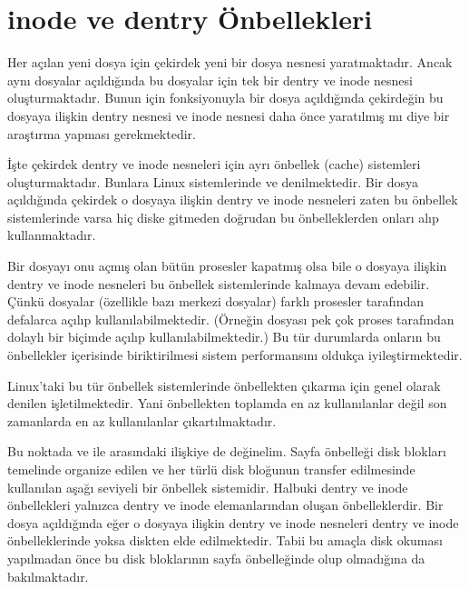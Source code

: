 \documentclass[a4paper,10pt,turkish]{sphinxmanual}
\begin{document}
\section{inode ve dentry Önbellekleri}
\label{\detokenize{filesystem1:inode-ve-dentry-onbellekleri}}
\sphinxAtStartPar
Her açılan yeni dosya için çekirdek yeni bir dosya nesnesi yaratmaktadır. Ancak aynı dosyalar
açıldığında bu dosyalar için tek bir dentry ve inode nesnesi oluşturmaktadır. Bunun için 
fonksiyonuyla bir dosya açıldığında çekirdeğin bu dosyaya ilişkin dentry nesnesi ve inode nesnesi
daha önce yaratılmış mı diye bir araştırma yapması gerekmektedir.

\sphinxAtStartPar
İşte çekirdek dentry ve inode nesneleri için ayrı önbellek (cache) sistemleri oluşturmaktadır.
Bunlara Linux sistemlerinde  ve 
denilmektedir. Bir dosya açıldığında çekirdek o dosyaya ilişkin dentry ve inode nesneleri zaten
bu önbellek sistemlerinde varsa hiç diske gitmeden doğrudan bu önbelleklerden onları alıp
kullanmaktadır.

\sphinxAtStartPar
Bir dosyayı onu açmış olan bütün prosesler kapatmış olsa bile o dosyaya ilişkin dentry ve inode
nesneleri bu önbellek sistemlerinde kalmaya devam edebilir. Çünkü dosyalar (özellikle bazı
merkezi dosyalar) farklı prosesler tarafından defalarca açılıp kullanılabilmektedir. (Örneğin
 dosyası pek çok proses tarafından dolaylı bir biçimde açılıp kullanılabilmektedir.)
Bu tür durumlarda onların bu önbellekler içerisinde biriktirilmesi sistem performansını oldukça
iyileştirmektedir.

\sphinxAtStartPar
Linux’taki bu tür önbellek sistemlerinde önbellekten çıkarma için genel olarak  denilen  işletilmektedir.
Yani önbellekten toplamda en az kullanılanlar değil son zamanlarda en az kullanılanlar
çıkartılmaktadır.

\sphinxAtStartPar
Bu noktada  ve  ile  arasındaki
ilişkiye de değinelim. Sayfa önbelleği disk blokları temelinde organize edilen ve her türlü disk
bloğunun transfer edilmesinde kullanılan aşağı seviyeli bir önbellek sistemidir. Halbuki dentry
ve inode önbellekleri yalnızca dentry ve inode elemanlarından oluşan önbelleklerdir. Bir dosya
açıldığında eğer o dosyaya ilişkin dentry ve inode nesneleri dentry ve inode önbelleklerinde
yoksa diskten elde edilmektedir. Tabii bu amaçla disk okuması yapılmadan önce bu disk bloklarının
sayfa önbelleğinde olup olmadığına da bakılmaktadır.
\end{document}
